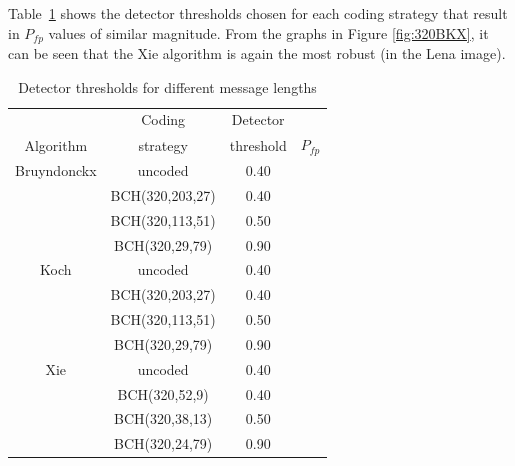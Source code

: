 \documentclass[10pt,twocolumn]{article}
\begin{document}
\normalsize
Table~\ref{tab:320ResBKX} shows the detector thresholds chosen for each coding strategy that result in $P_{fp}$ values of
similar magnitude. From the graphs in Figure \ref{fig:320BKX}, it can be seen that the Xie algorithm is again the most robust
(in the Lena image). 
\begin{table}[!htb]
\footnotesize
        \begin{center}
		\begin{tabular}{|c|c|c|c|} \hline
				& Coding		& Detector	& 		\\ 
		Algorithm 	& strategy		& threshold	& $P_{fp}$ 	\\\hline\hline

		Bruyndonckx	& uncoded		& 0.40		& \raisebox{-0.3ex}{ $< 2.3\times 10^{-7}$ }	\\ \cline{2-4}
				& BCH(320,203,27)	& 0.40		& \raisebox{-0.4ex}{ $< 2.3\times 10^{-7}$ }	\\ \cline{2-4}
				& BCH(320,113,51)	& 0.50		& \raisebox{-0.4ex}{ $1.1\times 10^{-7}$ }	\\ \cline{2-4}
				& BCH(320,29,79)	& 0.90		& \raisebox{-0.4ex}{ $8.1\times 10^{-7}$ }	\\ \hline\hline

		Koch 		& uncoded		& 0.40		& \raisebox{-0.3ex}{ $< 2.3\times 10^{-7}$ }	\\ \cline{2-4}
				& BCH(320,203,27)	& 0.40		& \raisebox{-0.4ex}{ $< 2.3\times 10^{-7}$ }	\\ \cline{2-4}
				& BCH(320,113,51)   	& 0.50  	& \raisebox{-0.4ex}{ $1.1\times 10^{-7}$ }	\\ \cline{2-4}	
				& BCH(320,29,79)	& 0.90		& \raisebox{-0.4ex}{ $8.1\times 10^{-7}$ }	\\ \hline\hline	

		Xie		& uncoded               & 0.40		&  \raisebox{-0.3ex}{ $< 2.3\times 10^{-7}$ }	\\ \cline{2-4}
				& BCH(320,52,9)          & 0.40		&  \raisebox{-0.4ex}{ $< 2.3\times 10^{-7}$ }	\\ \cline{2-4} 	
				& BCH(320,38,13)         & 0.50 	& \raisebox{-0.4ex}{ $1.1\times 10^{-7}$ }	\\ \cline{2-4} 
				& BCH(320,24,79)         & 0.90		& \raisebox{-0.4ex}{ $8.1\times 10^{-7}$ }	\\ \hline 
	\end{tabular} 
	\caption{Detector thresholds for different message lengths}
	\label{tab:320ResBKX}
	\end{center}
\end{table}
\end{document}
